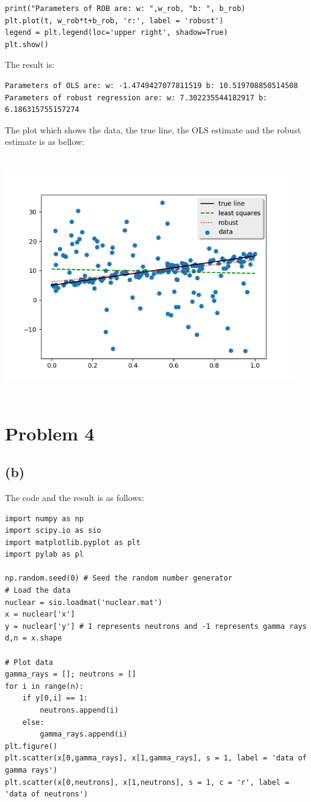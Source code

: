 \documentclass[letterpaper,11pt]{article}
\begin{document}
\begin{spacing}{1.2}
\begin{lstlisting}
print("Parameters of ROB are: w: ",w_rob, "b: ", b_rob)
plt.plot(t, w_rob*t+b_rob, 'r:', label = 'robust')
legend = plt.legend(loc='upper right', shadow=True)
plt.show()
\end{lstlisting}
The result is:
\begin{lstlisting}
Parameters of OLS are: w: -1.4749427077811519 b: 10.519708850514508
Parameters of robust regression are: w: 7.302235544182917 b: 6.186315755157274
\end{lstlisting}
The plot which shows the data, the true line, the OLS estimate and the robust estimate is as bellow:

\includegraphics[width=4.95in,height=4.05in]{Robust_Regression.png}

\section*{Problem 4}
\subsection*{(b)}
The code and the result is as follows:
\begin{lstlisting}
import numpy as np
import scipy.io as sio
import matplotlib.pyplot as plt
import pylab as pl

np.random.seed(0) # Seed the random number generator
# Load the data
nuclear = sio.loadmat('nuclear.mat')
x = nuclear['x']
y = nuclear['y'] # 1 represents neutrons and -1 represents gamma rays
d,n = x.shape

# Plot data
gamma_rays = []; neutrons = []
for i in range(n):
    if y[0,i] == 1:
        neutrons.append(i)
    else:
        gamma_rays.append(i)
plt.figure()
plt.scatter(x[0,gamma_rays], x[1,gamma_rays], s = 1, label = 'data of gamma rays')
plt.scatter(x[0,neutrons], x[1,neutrons], s = 1, c = 'r', label = 'data of neutrons')


\end{lstlisting}
\end{spacing}
\end{document}
